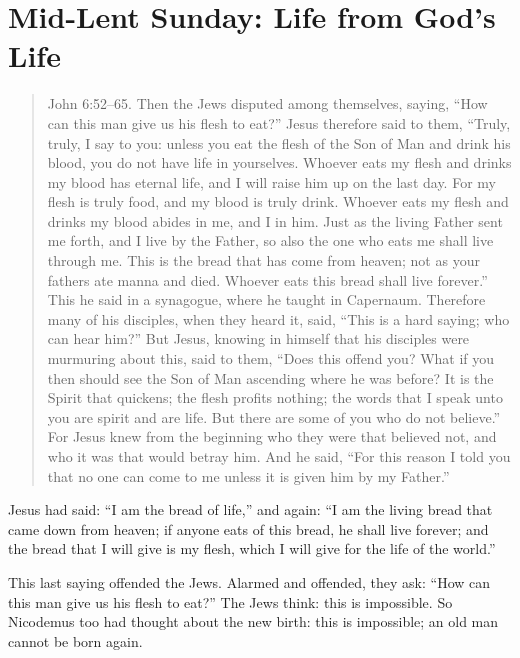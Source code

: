 
\section{Mid-Lent Sunday: Life from God’s Life}


\begin{quote}

John 6:52–65. Then the Jews disputed among themselves, saying, “How can this man give us his flesh to eat?” Jesus therefore said to them, “Truly, truly, I say to you: unless you eat the flesh of the Son of Man and drink his blood, you do not have life in yourselves. Whoever eats my flesh and drinks my blood has eternal life, and I will raise him up on the last day. For my flesh is truly food, and my blood is truly drink. Whoever eats my flesh and drinks my blood abides in me, and I in him. Just as the living Father sent me forth, and I live by the Father, so also the one who eats me shall live through me. This is the bread that has come from heaven; not as your fathers ate manna and died. Whoever eats this bread shall live forever.” This he said in a synagogue, where he taught in Capernaum. Therefore many of his disciples, when they heard it, said, “This is a hard saying; who can hear him?” But Jesus, knowing in himself that his disciples were murmuring about this, said to them, “Does this offend you? What if you then should see the Son of Man ascending where he was before? It is the Spirit that quickens; the flesh profits nothing; the words that I speak unto you are spirit and are life. But there are some of you who do not believe.” For Jesus knew from the beginning who they were that believed not, and who it was that would betray him. And he said, “For this reason I told you that no one can come to me unless it is given him by my Father.”

\end{quote}

\bigskip


Jesus had said: “I am the bread of life,” and again: “I am the living bread that came down from heaven; if anyone eats of this bread, he shall live forever; and the bread that I will give is my flesh, which I will give for the life of the world.”

This last saying offended the Jews. Alarmed and offended, they ask: “How can this man give us his flesh to eat?” The Jews think: this is impossible. So Nicodemus too had thought about the new birth: this is impossible; an old man cannot be born again.

